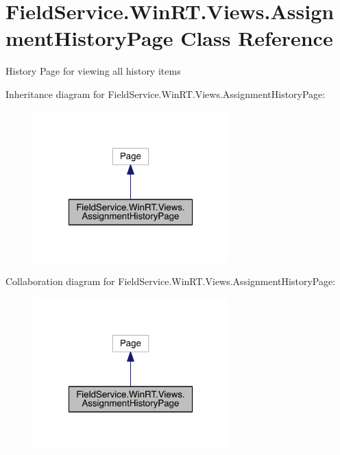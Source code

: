 \hypertarget{class_field_service_1_1_win_r_t_1_1_views_1_1_assignment_history_page}{\section{Field\+Service.\+Win\+R\+T.\+Views.\+Assignment\+History\+Page Class Reference}
\label{class_field_service_1_1_win_r_t_1_1_views_1_1_assignment_history_page}
}


History Page for viewing all history items  




Inheritance diagram for Field\+Service.\+Win\+R\+T.\+Views.\+Assignment\+History\+Page\+:
\nopagebreak
\begin{figure}[H]
\begin{center}
\leavevmode
\includegraphics[width=214pt]{class_field_service_1_1_win_r_t_1_1_views_1_1_assignment_history_page__inherit__graph}
\end{center}
\end{figure}


Collaboration diagram for Field\+Service.\+Win\+R\+T.\+Views.\+Assignment\+History\+Page\+:
\nopagebreak
\begin{figure}[H]
\begin{center}
\leavevmode
\includegraphics[width=214pt]{class_field_service_1_1_win_r_t_1_1_views_1_1_assignment_history_page__coll__graph}
\end{center}
\end{figure}
